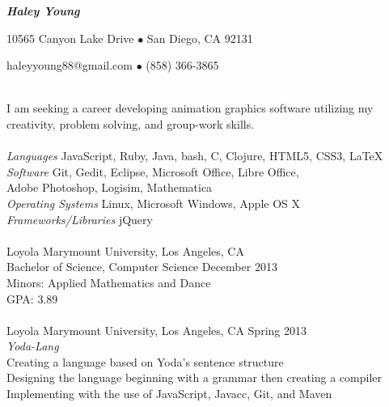 \documentclass[11pt]{article}
\begin{document}
\centerline{{\Large \bf \emph{Haley Young}}}
\centerline{10565 Canyon Lake Drive $\bullet$ San Diego, CA 92131}
\centerline{haleyyoung88@gmail.com $\bullet$ (858) 366-3865}
\vspace{5.5 mm}

\vspace{3mm}\\
\indent I am seeking a career developing animation graphics software utilizing my creativity, problem solving, and
\indent group-work skills.\\

\vspace{1.5mm}\\
\indent \emph{Languages} \hfill JavaScript, Ruby, Java, bash, C, Clojure, HTML5, CSS3, LaTeX\\
\indent \emph{Software} \hfill  Git, Gedit, Eclipse, Microsoft Office, Libre Office,\\
\indent \hfill Adobe Photoshop, Logisim, Mathematica        \\
\indent \emph{Operating Systems} \hfill Linux, Microsoft Windows, Apple OS X\\
\indent \emph{Frameworks/Libraries} \hfill jQuery\\

\vspace{1.5mm}\\
\indent Loyola Marymount University, Los Angeles, CA\\
\indent Bachelor of Science, Computer Science \hfill December 2013\\
\indent Minors: Applied Mathematics and Dance\\
\indent GPA: 3.89\\

\vspace{1.5mm}\\
\indent Loyola Marymount University, Los Angeles, CA \hfill Spring 2013\\
\indent \emph{Yoda-Lang}\\
\indent \indent Creating a language based on Yoda's sentence structure\\
\indent \indent Designing the language beginning with a grammar then creating a compiler\\
\indent \indent Implementing with the use of JavaScript, Javacc, Git, and Maven\\
\end{document}

